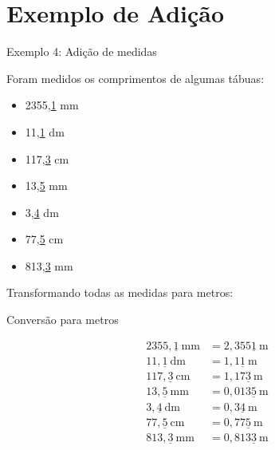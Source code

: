 \documentclass[aspectratio=169,10pt]{beamer}
\begin{document}
\section{Exemplo de Adição}

\begin{frame}{Exemplo 4: Adição de medidas}

Foram medidos os comprimentos de algumas tábuas:

\begin{itemize}
\item 2355,\underline{1} mm
\item 11,\underline{1} dm
\item 117,\underline{3} cm
\item 13,\underline{5} mm
\item 3,\underline{4} dm
\item 77,\underline{5} cm
\item 813,\underline{3} mm
\end{itemize}

Transformando todas as medidas para metros:

\end{frame}


\begin{frame}{Conversão para metros}

\begin{align*}
2355,\underline{1}\ \text{mm} &= 2,355\underline{1}\ \text{m} \\
11,\underline{1}\ \text{dm} &= 1,1\underline{1}\ \text{m} \\
117,\underline{3}\ \text{cm} &= 1,17\underline{3}\ \text{m} \\
13,\underline{5}\ \text{mm} &= 0,013\underline{5}\ \text{m} \\
3,\underline{4}\ \text{dm} &= 0,3\underline{4}\ \text{m} \\
77,\underline{5}\ \text{cm} &= 0,77\underline{5}\ \text{m} \\
813,\underline{3}\ \text{mm} &= 0,813\underline{3}\ \text{m}
\end{align*}

\end{frame}

\end{document}
